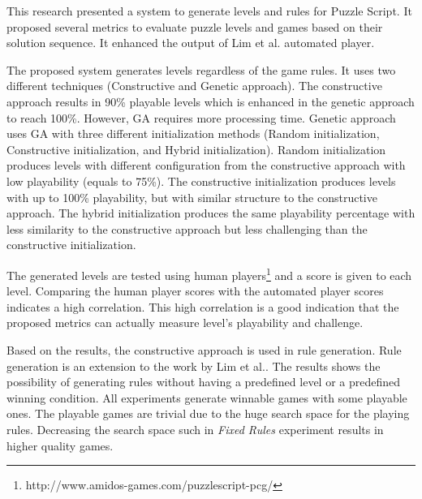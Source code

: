 This research presented a system to generate levels and rules for Puzzle Script. It proposed several metrics to evaluate puzzle levels and games based on their solution sequence. It enhanced the output of Lim et al. automated player\cite{puzzleScriptGeneration}.\\\par

The proposed system generates levels regardless of the game rules. It uses two different techniques (Constructive and Genetic approach). The constructive approach results in 90\% playable levels which is enhanced in the genetic approach to reach 100\%. However, GA requires more processing time. Genetic approach uses GA with three different initialization methods (Random initialization, Constructive initialization, and Hybrid initialization). Random initialization produces levels with different configuration from the constructive approach with low playability (equals to 75\%).  The constructive initialization produces levels with up to 100\% playability, but with similar structure to the constructive approach. The hybrid initialization produces the same playability percentage with less similarity to the constructive approach but less challenging than the constructive initialization.\\\par

The generated levels are tested using human players\footnote{http://www.amidos-games.com/puzzlescript-pcg/} and a score is given to each level. Comparing the human player scores with the automated player scores indicates a high correlation. This high correlation is a good indication that the proposed metrics can actually measure level's playability and challenge.\\\par

Based on the results, the constructive approach is used in rule generation. Rule generation is an extension to the work by Lim et al.\cite{puzzleScriptGeneration}. The results shows the possibility of generating rules without having a predefined level or a predefined winning condition. All experiments generate winnable games with some playable ones. The playable games are trivial due to the huge search space for the playing rules. Decreasing the search space such in \emph{Fixed Rules} experiment results in higher quality games.\\\par

